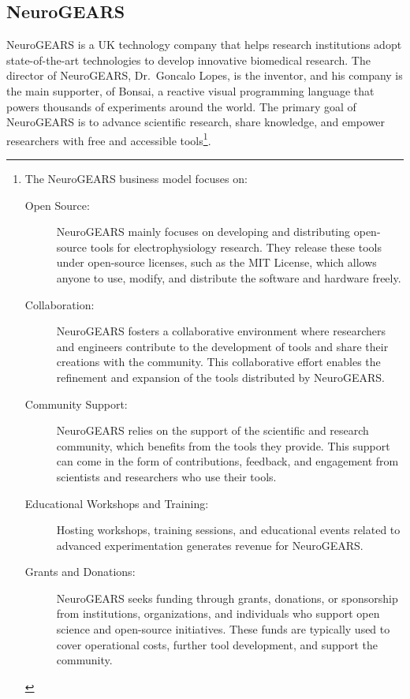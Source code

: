 \subsection{NeuroGEARS}

NeuroGEARS is a UK technology company that helps research institutions adopt
state-of-the-art technologies to develop innovative biomedical research.  The
director of NeuroGEARS, Dr.~Goncalo Lopes, is the inventor, and his company is
the main supporter, of Bonsai, a reactive visual programming language that
powers thousands of experiments around the world. 
The primary goal of NeuroGEARS is to advance scientific research, share knowledge,
and empower researchers with free and accessible tools\footnote{
The NeuroGEARS business model focuses on:

\begin{description}

	\item[Open Source:] NeuroGEARS mainly focuses on developing and
distributing open-source tools for electrophysiology research. They release
these tools under open-source licenses, such as the MIT License, which allows
anyone to use, modify, and distribute the software and hardware freely.

	\item[Collaboration:] NeuroGEARS fosters a collaborative environment where
researchers and engineers contribute to the development of tools and share
their creations with the community. This collaborative effort enables the
refinement and expansion of the tools distributed by NeuroGEARS.

	\item[Community Support:] NeuroGEARS relies on the support of the
scientific and research community, which benefits from the tools they provide.
This support can come in the form of contributions, feedback, and engagement
from scientists and researchers who use their tools.

	\item[Educational Workshops and Training:] Hosting workshops, training
sessions, and educational events related to advanced experimentation generates
revenue for NeuroGEARS.

	\item[Grants and Donations:] NeuroGEARS seeks funding through grants,
donations, or sponsorship from institutions, organizations, and individuals who
support open science and open-source initiatives. These funds are typically
used to cover operational costs, further tool development, and support the
community.

\end{description}

}.

